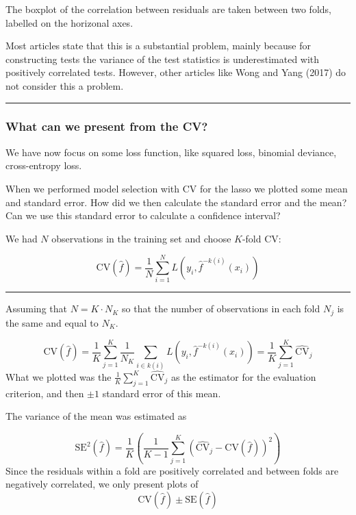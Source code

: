\documentclass[
  letterpaper,
  DIV=11,
  numbers=noendperiod]{scrartcl}
\begin{document}
The boxplot of the correlation between residuals are taken between two
folds, labelled on the horizonal axes.

Most articles state that this is a substantial problem, mainly because
for constructing tests the variance of the test statistics is
underestimated with positively correlated tests. However, other articles
like Wong and Yang (2017) do not consider this a problem.

\begin{center}\rule{0.5\linewidth}{0.5pt}\end{center}

\hypertarget{what-can-we-present-from-the-cv}{%
\subsubsection{What can we present from the
CV?}\label{what-can-we-present-from-the-cv}}

We have now focus on some loss function, like squared loss, binomial
deviance, cross-entropy loss.

When we performed model selection with CV for the lasso we plotted some
mean and standard error. How did we then calculate the standard error
and the mean? Can we use this standard error to calculate a confidence
interval?

We had \(N\) observations in the training set and choose \(K\)-fold CV:

\[ \text{CV}(\hat{f})=\frac{1}{N}\sum_{i=1}^N L(y_i,\hat{f}^{-k(i)}(x_i))\]

\begin{center}\rule{0.5\linewidth}{0.5pt}\end{center}

Assuming that \(N=K \cdot N_K\) so that the number of observations in
each fold \(N_j\) is the same and equal to \(N_K\).

\[ \text{CV}(\hat{f})=\frac{1}{K}\sum_{j=1}^K \frac{1}{N_K}\sum_{i \in k(i)} L(y_i,\hat{f}^{-k(i)}(x_i))=\frac{1}{K}\sum_{j=1}^K \widehat{\text{CV}}_j\]
What we plotted was the
\(\frac{1}{K}\sum_{j=1}^K \widehat{\text{CV}}_j\) as the estimator for
the evaluation criterion, and then \(\pm 1\) standard error of this
mean.

The variance of the mean was estimated as

\[\text{SE}^2(\hat{f})=\frac{1}{K}(\frac{1}{K-1}\sum_{j=1}^K (\widehat{\text{CV}}_j-\text{CV}(\hat{f}))^2 )\]
Since the residuals within a fold are positively correlated and between
folds are negatively correlated, we only present plots of
\[\text{CV}(\hat{f}) \pm \text{SE}(\hat{f})\]
\end{document}
